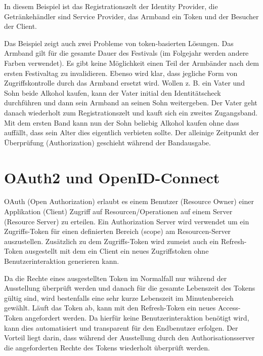 In diesem Beispiel ist das Registrationszelt der Identity Provider, die Getränkehändler sind Service Provider, das Armband ein Token und der Besucher der Client.

Das Beispiel zeigt auch zwei Probleme von token-basierten Lösungen. Das Armband gilt für die gesamte Dauer des Festivals (im Folgejahr werden andere Farben verwendet). Es gibt keine Möglichkeit einen Teil der Armbänder nach dem ersten Festivaltag zu invalidieren. Ebenso wird klar, dass jegliche Form von Zugriffskontrolle durch das Armband ersetzt wird. Wollen z. B. ein Vater und Sohn beide Alkohol kaufen, kann der Vater initial den Identitätscheck durchführen und dann sein Armband an seinen Sohn weitergeben. Der Vater geht danach wiederholt zum Registrationszelt und kauft sich ein zweites Zugangsband. Mit dem ersten Band kann nun der Sohn beliebig Alkohol kaufen ohne dass auffällt, dass sein Alter dies eigentlich verbieten sollte. Der alleinige Zeitpunkt der Überprüfung (Authorization) geschieht während der Bandausgabe.

\section{OAuth2 und OpenID-Connect}

OAuth (Open Authorization) erlaubt es einem Benutzer (Resource Owner) einer Applikation (Client) Zugriff auf Resourcen/Operationen auf einem Server (Resource Server) zu erteilen. Ein Authorization Server wird verwendet um ein Zugriffs-Token für einen definierten Bereich (scope) am Resourcen-Server auszustellen. Zusätzlich zu dem Zugriffs-Token wird zumeist auch ein Refresh-Token ausgestellt mit dem ein Client ein neues Zugriffstoken ohne Benutzerinteraktion generieren kann.

Da die Rechte eines ausgestellten Token im Normalfall nur während der Ausstellung überprüft werden und danach für die gesamte Lebenszeit des Tokens gültig sind, wird bestenfalls eine sehr kurze Lebenszeit im Minutenbereich gewählt. Läuft das Token ab, kann mit den Refresh-Token ein neues Access-Token angefordert werden. Da hierfür keine Benutzerinteraktion benötigt wird, kann dies automatisiert und transparent für den Endbenutzer erfolgen. Der Vorteil liegt darin, dass während der Ausstellung durch den Authorisationsserver die angeforderten Rechte des Tokens wiederholt überprüft werden.

